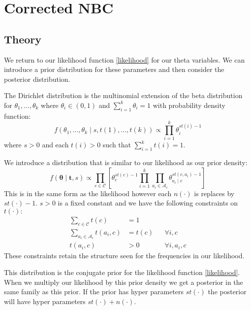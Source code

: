 \chapter{Corrected NBC}

\section{Theory}

We return to our likelihood function \cref{likelihood} for our theta variables.
We can introduce a prior distribution for these parameters and then consider the posterior distribution.

The Dirichlet distribution is the multinomial extension of the beta distribution for $\theta_1,\dots,\theta_k$ where $\theta_i \in (0,1)$ and $\sum_{i=1}^k \theta_i = 1$ with probability density function:
\begin{equation} \label{dirichlet_pdf}
	f(\theta_1,\dots,\theta_k \mid s, t(1),\dots,t(k)) \propto \prod_{i=1}^k \theta_i^{st(i) - 1}
\end{equation}
where $s > 0$ and each $t(i)>0$ such that $\sum_{i=1}^{k}t(i) = 1$.

We introduce a distribution that is similar to our likelihood as our prior density:
\begin{equation} \label{prior}
	f(\mathbf{\theta} \mid \mathbf{t}, s) \propto \prod_{c \in \mathcal{C}} \left[ \theta_c^{st(c) - 1} \prod_{i=1}^k \prod_{a_i \in \mathcal{A}_i} \theta_{a_i \mid c}^{st(c, a_i) - 1} \right]
\end{equation}
This is in the same form as the likelihood however each $n(\cdot)$ is replaces by $st(\cdot) - 1$.
$s > 0$ is a fixed constant and we have the following constraints on $t(\cdot):$
\begin{align}\label{prior_constraints}
	\sum_{c \in \mathcal{C}} t(c) & = 1 \\
	\sum_{a_i \in \mathcal{A}_i} t(a_i, c) & = t(c) && \forall i, c \\
	t(a_i, c) & > 0 && \forall i, a_i, c
\end{align}
These constraints retain the structure seen for the frequencies in our likelihood.

This distribution is the conjugate prior for the likelihood function \cref{likelihood}.
When we multiply our likelihood by this prior density we get a posterior in the same family as this prior.
If the prior has hyper parameters $st(\cdot)$ the posterior will have hyper parameters $st(\cdot) + n(\cdot)$.

